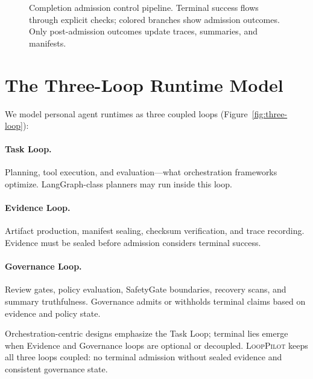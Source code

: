 \documentclass[11pt]{article}
\newcommand{\looppilot}{\textsc{LoopPilot}}
\begin{document}
\begin{figure}[t]
  \caption{Completion admission control pipeline.
  Terminal success flows through explicit checks; colored branches show admission outcomes.
  Only post-admission outcomes update traces, summaries, and manifests.}
  \label{fig:cac-pipeline}
\end{figure}

\section{The Three-Loop Runtime Model}
\label{sec:three-loop}

We model personal agent runtimes as three coupled loops (Figure~\ref{fig:three-loop}):

\paragraph{Task Loop.}
Planning, tool execution, and evaluation---what orchestration frameworks optimize.
LangGraph-class planners may run inside this loop.

\paragraph{Evidence Loop.}
Artifact production, manifest sealing, checksum verification, and trace recording.
Evidence must be sealed before admission considers terminal success.

\paragraph{Governance Loop.}
Review gates, policy evaluation, SafetyGate boundaries, recovery scans, and summary truthfulness.
Governance admits or withholds terminal claims based on evidence and policy state.

Orchestration-centric designs emphasize the Task Loop; terminal lies emerge when Evidence and Governance loops are optional or decoupled.
\looppilot{} keeps all three loops coupled: no terminal admission without sealed evidence and consistent governance state.
\end{document}
